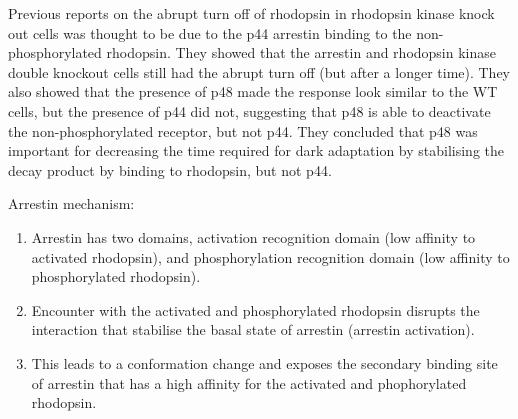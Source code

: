 \documentclass[a4paper,12pt]{article}
\begin{document}
Previous reports on the abrupt turn off of rhodopsin in rhodopsin kinase knock out cells was thought to be due to the p44 arrestin binding to the non-phosphorylated rhodopsin.
They showed that the arrestin and rhodopsin kinase double knockout cells still had the abrupt turn off (but after a longer time).
They also showed that the presence of p48 made the response look similar to the WT cells, but the presence of p44 did not, suggesting that p48 is able to deactivate the non-phosphorylated receptor, but not p44.
They concluded that p48 was important for decreasing the time required for dark adaptation by stabilising the decay product by binding to rhodopsin, but not p44.

Arrestin mechanism:

\begin{enumerate}
\item Arrestin has two domains, activation recognition domain (low affinity to activated rhodopsin), and phosphorylation recognition domain (low affinity to phosphorylated rhodopsin).
\item Encounter with the activated and phosphorylated rhodopsin disrupts the interaction that stabilise the basal state of arrestin (arrestin activation).
\item This leads to a conformation change and exposes the secondary binding site of arrestin that has a high affinity for the activated and phophorylated rhodopsin.
\end{enumerate}
\end{document}
